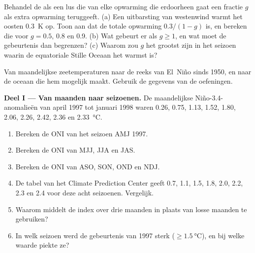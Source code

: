 \begin{exercise}[$\star\star\star$]\label{exo:b2:climate-variability:12}
Behandel de  als een lus die van elke opwarming die erdoorheen gaat een fractie $g$
als extra opwarming teruggeeft. (a) Een uitbarsting van westenwind warmt het oosten \qty{0.3}{K} op. Toon aan
dat de totale opwarming $0.3/(1 - g)$ is, en bereken die voor $g = 0.5$, 0.8 en 0.9. (b) Wat
gebeurt er als $g \geq 1$, en wat moet de gebeurtenis dan begrenzen? (c) Waarom zou $g$ het grootst zijn in het
seizoen waarin de equatoriale Stille Oceaan het warmst is?
\end{exercise}

\begin{problem}\label{pb:b2:climate-variability:1}
Van maandelijkse zeetemperaturen naar de reeks van El~Niño sinds 1950, en naar de oceaan die hem
mogelijk maakt. Gebruik de gegevens van de oefeningen.

\medskip\noindent\textbf{Deel I --- Van maanden naar seizoenen.}
De maandelijkse Niño-3.4-anomalieën van april 1997 tot januari 1998 waren 0.26, 0.75, 1.13, 1.52, 1.80,
2.06, 2.26, 2.42, 2.36 en \qty{2.33}{\celsius}.
\begin{enumerate}
  \item Bereken de ONI van het seizoen AMJ 1997.
  \item Bereken de ONI van MJJ, JJA en JAS.
  \item Bereken de ONI van ASO, SON, OND en NDJ.
  \item De tabel van het Climate Prediction Center geeft 0.7, 1.1, 1.5, 1.8, 2.0, 2.2, 2.3 en
        2.4 voor deze acht seizoenen. Vergelijk.
  \item Waarom middelt de index over drie maanden in plaats van losse maanden te gebruiken?
  \item In welk seizoen werd de gebeurtenis van 1997 sterk ($\geq \qty{1.5}{\celsius}$), en bij
        welke waarde piekte ze?
\end{enumerate}


\end{problem}
